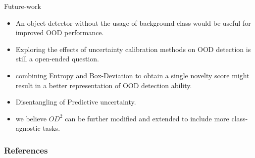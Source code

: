 \documentclass[10pt, aspectratio=169]{beamer}
\begin{document}
\begin{frame}[allowframebreaks]{Future-work}
    \begin{itemize}
        \item An object detector without the usage of background class would be useful for improved OOD performance.
        \item Exploring the effects of uncertainty calibration methods \cite{GuoCalibration2017} on OOD detection is still a open-ended question.
        \item combining Entropy and Box-Deviation to obtain a single novelty score might result in a better representation of OOD detection ability.
        \item Disentangling of Predictive uncertainty.
        \item we believe $OD^2$ can be further modified and extended to include more class-agnostic tasks.
    \end{itemize}
\end{frame}

\begin{frame}[allowframebreaks]
    \frametitle{References}
    
    {\small
}
\end{frame}
\end{document}
